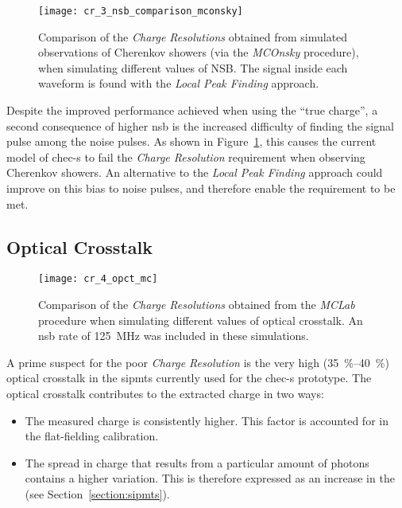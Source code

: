 \begin{figure}
	\centering
    \texttt{[image: cr\_3\_nsb\_comparison\_mconsky]} 
	\caption[Comparison of the \textit{Charge Resolution} at two different NSBs when observing Cherenkov showers (via the\textit{MCOnsky} procedure).]{Comparison of the \textit{Charge Resolutions} obtained from simulated observations of Cherenkov showers (via the \textit{MCOnsky} procedure), when simulating different values of NSB. The signal inside each waveform is found with the \textit{Local Peak Finding} approach.}
	\label{fig:cr_3_nsb_comparison_mconsky}
\end{figure}

Despite the improved performance achieved when using the ``true charge'', a second consequence of higher \gls{nsb} is the increased difficulty of finding the signal pulse among the noise pulses. As shown in Figure~\ref{fig:cr_3_nsb_comparison_mconsky}, this causes the current model of \gls{chec-s} to fail the \textit{Charge Resolution} requirement when observing Cherenkov showers. An alternative to the \textit{Local Peak Finding} approach could improve on this bias to noise pulses, and therefore enable the requirement to be met.

\subsection{Optical Crosstalk}

\begin{figure}[H]
	\centering
    \texttt{[image: cr\_4\_opct\_mc]} 
	\caption[Comparison of the \textit{Charge Resolution} at different values of optical crosstalk.]{Comparison of the \textit{Charge Resolutions} obtained from the \textit{MCLab} procedure when simulating different values of optical crosstalk. An \gls{nsb} rate of \SI{125}{MHz} was included in these simulations.}
	\label{fig:cr_4_opct_mc}
\end{figure}

A prime suspect for the poor \textit{Charge Resolution} is the very high (\SIrange{35}{40}{\percent}) optical crosstalk in the \glspl{sipmt} currently used for the \gls{chec-s} prototype. The optical crosstalk contributes to the extracted charge in two ways: 
\begin{itemize}
\item The measured charge is consistently higher. This factor is accounted for in the flat-fielding calibration.
\item The spread in charge that results from a particular amount of photons contains a higher variation. This is therefore expressed as an increase in the  (see Section~\ref{section:sipmts}).
\end{itemize}

